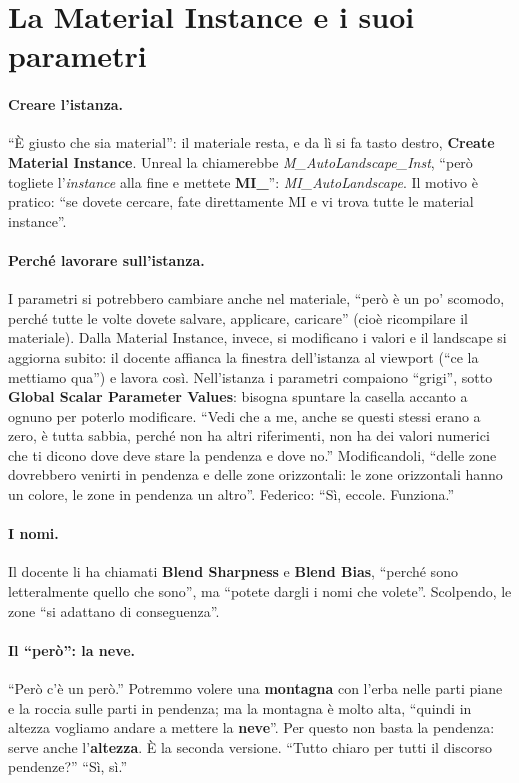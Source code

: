\section{La Material Instance e i suoi parametri}
\label{ue15:sec:instance}

\paragraph{Creare l'istanza.} ``È giusto che sia material'': il materiale resta, e da lì si
fa tasto destro, \textbf{Create Material Instance}. Unreal la chiamerebbe
\emph{M\_AutoLandscape\_Inst}, ``però togliete l'\emph{instance} alla fine e mettete
\textbf{MI\_}'': \emph{MI\_AutoLandscape}. Il motivo è pratico: ``se dovete cercare, fate
direttamente MI e vi trova tutte le material instance''.

\paragraph{Perché lavorare sull'istanza.} I parametri si potrebbero cambiare anche nel
materiale, ``però è un po' scomodo, perché tutte le volte dovete salvare, applicare,
caricare'' (cioè ricompilare il materiale). Dalla Material Instance, invece, si modificano i
valori e il landscape si aggiorna subito: il docente affianca la finestra dell'istanza al
viewport (``ce la mettiamo qua'') e lavora così. Nell'istanza i parametri compaiono
``grigi'', sotto \textbf{Global Scalar Parameter Values}: bisogna spuntare la casella
accanto a ognuno per poterlo modificare. ``Vedi che a me, anche se questi stessi erano a
zero, è tutta sabbia, perché non ha altri riferimenti, non ha dei valori numerici che ti
dicono dove deve stare la pendenza e dove no.'' Modificandoli, ``delle zone dovrebbero
venirti in pendenza e delle zone orizzontali: le zone orizzontali hanno un colore, le zone in
pendenza un altro''. Federico: ``Sì, eccole. Funziona.''

\paragraph{I nomi.} Il docente li ha chiamati \textbf{Blend Sharpness} e \textbf{Blend
Bias}, ``perché sono letteralmente quello che sono'', ma ``potete dargli i nomi che
volete''. Scolpendo, le zone ``si adattano di conseguenza''.

\paragraph{Il ``però'': la neve.} ``Però c'è un però.'' Potremmo volere una
\textbf{montagna} con l'erba nelle parti piane e la roccia sulle parti in pendenza; ma la
montagna è molto alta, ``quindi in altezza vogliamo andare a mettere la \textbf{neve}''.
Per questo non basta la pendenza: serve anche l'\textbf{altezza}. È la seconda versione.
``Tutto chiaro per tutti il discorso pendenze?'' ``Sì, sì.''

